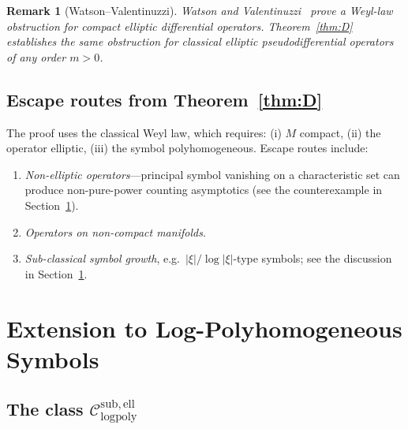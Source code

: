 \documentclass[12pt]{amsart}
\newtheorem{remark}[theorem]{Remark}
\newcommand{\Csub}{\mathcal{C}_{\mathrm{logpoly}}^{\mathrm{sub,ell}}}
\begin{document}
\begin{remark}[Watson--Valentinuzzi]
Watson and Valentinuzzi~\cite{Watson2026} prove a Weyl-law obstruction
for compact elliptic differential operators.  Theorem~\ref{thm:D} establishes
the same obstruction for classical elliptic pseudodifferential
operators of any order $m>0$.
\end{remark}

\subsection*{Escape routes from Theorem~\ref{thm:D}}

The proof uses the classical Weyl law, which requires: (i) $M$ compact,
(ii) the operator elliptic, (iii) the symbol polyhomogeneous.
Escape routes include:
\begin{enumerate}[label=(\arabic*)]
\item \emph{Non-elliptic operators}---principal symbol vanishing on a
  characteristic set can produce non-pure-power counting asymptotics
  (see the counterexample in Section~\ref{sec:logpoly}).
\item \emph{Operators on non-compact manifolds.}
\item \emph{Sub-classical symbol growth}, e.g.\ $|\xi|/\log|\xi|$-type
  symbols; see the discussion in Section~\ref{sec:logpoly}.
\end{enumerate}

\section{Extension to Log-Polyhomogeneous Symbols}
\label{sec:logpoly}

\subsection{The class \texorpdfstring{$\Csub$}{C-logpoly}}
\end{document}

